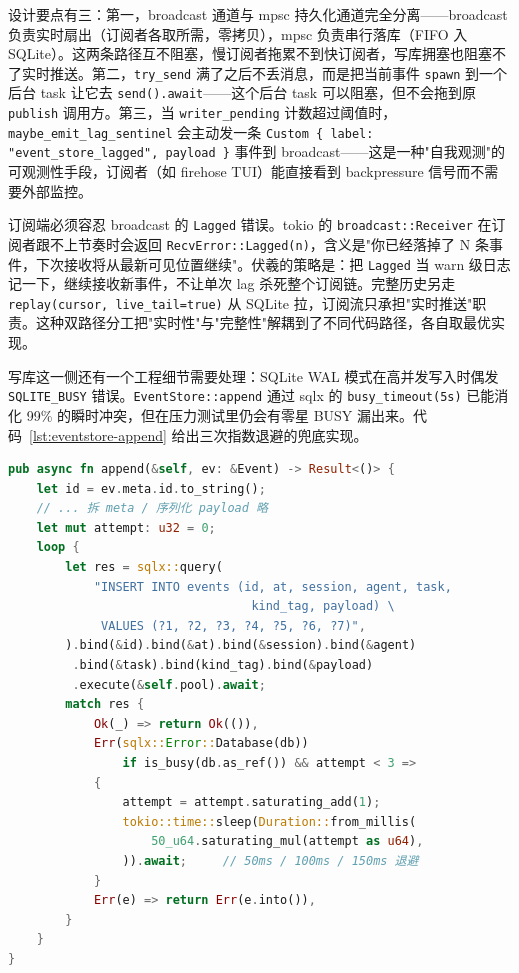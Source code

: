 设计要点有三：第一，broadcast 通道与 mpsc 持久化通道完全分离——broadcast 负责实时扇出（订阅者各取所需，零拷贝），mpsc 负责串行落库（FIFO 入 SQLite）。这两条路径互不阻塞，慢订阅者拖累不到快订阅者，写库拥塞也阻塞不了实时推送。第二，\texttt{try\_send} 满了之后不丢消息，而是把当前事件 \texttt{spawn} 到一个后台 task 让它去 \texttt{send().await}——这个后台 task 可以阻塞，但不会拖到原 \texttt{publish} 调用方。第三，当 \texttt{writer\_pending} 计数超过阈值时，\texttt{maybe\_emit\_lag\_sentinel} 会主动发一条 \texttt{Custom \{ label: "event\_store\_lagged", payload \}} 事件到 broadcast——这是一种"自我观测"的可观测性手段，订阅者（如 firehose TUI）能直接看到 backpressure 信号而不需要外部监控。

订阅端必须容忍 broadcast 的 \texttt{Lagged} 错误。tokio 的 \texttt{broadcast::Receiver} 在订阅者跟不上节奏时会返回 \texttt{RecvError::Lagged(n)}，含义是"你已经落掉了 N 条事件，下次接收将从最新可见位置继续"。伏羲的策略是：把 \texttt{Lagged} 当 warn 级日志记一下，继续接收新事件，不让单次 lag 杀死整个订阅链。完整历史另走 \texttt{replay(cursor, live\_tail=true)} 从 SQLite 拉，订阅流只承担"实时推送"职责。这种双路径分工把"实时性"与"完整性"解耦到了不同代码路径，各自取最优实现。

写库这一侧还有一个工程细节需要处理：SQLite WAL 模式在高并发写入时偶发 \texttt{SQLITE\_BUSY} 错误。\texttt{EventStore::append} 通过 sqlx 的 \texttt{busy\_timeout(5s)} 已能消化 99\% 的瞬时冲突，但在压力测试里仍会有零星 BUSY 漏出来。代码~\ref{lst:eventstore-append} 给出三次指数退避的兜底实现。

\begin{lstlisting}[language=Rust, caption={EventStore::append 三次指数退避（fuxi-events/src/store.rs）}, label={lst:eventstore-append}]
pub async fn append(&self, ev: &Event) -> Result<()> {
    let id = ev.meta.id.to_string();
    // ... 拆 meta / 序列化 payload 略
    let mut attempt: u32 = 0;
    loop {
        let res = sqlx::query(
            "INSERT INTO events (id, at, session, agent, task,
                                  kind_tag, payload) \
             VALUES (?1, ?2, ?3, ?4, ?5, ?6, ?7)",
        ).bind(&id).bind(&at).bind(&session).bind(&agent)
         .bind(&task).bind(kind_tag).bind(&payload)
         .execute(&self.pool).await;
        match res {
            Ok(_) => return Ok(()),
            Err(sqlx::Error::Database(db))
                if is_busy(db.as_ref()) && attempt < 3 =>
            {
                attempt = attempt.saturating_add(1);
                tokio::time::sleep(Duration::from_millis(
                    50_u64.saturating_mul(attempt as u64),
                )).await;     // 50ms / 100ms / 150ms 退避
            }
            Err(e) => return Err(e.into()),
        }
    }
}
\end{lstlisting}

